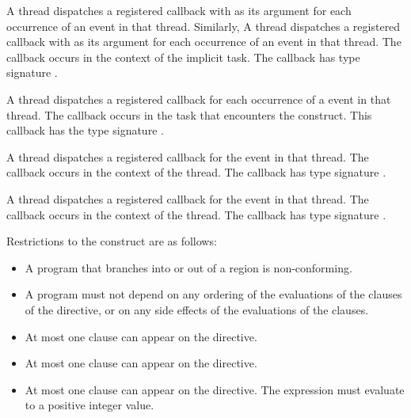 A thread dispatches a registered  callback 
with  as its  argument for each occurrence 
of an  event in that thread. Similarly, A thread 
dispatches a registered  callback with 
 as its  argument for each occurrence 
of an  event in that thread. The callback occurs in 
the context of the implicit task. The callback has type signature
.

A thread dispatches a registered 
callback for each occurrence of a  event in that
thread.  The callback occurs in the task that encounters the  
construct.  This callback has the type signature .

A thread dispatches a registered 
callback for the  event in that thread. The callback 
occurs in the context of the thread.  The callback has type signature
.

A thread dispatches a registered 
callback for the  event in that thread. The callback 
occurs in the context of the thread.  The callback has type signature
.

\restrictions
Restrictions to the  construct are as follows:

\begin{itemize}
\item A program that branches into or out of a  region is 
      non-conforming.
\item A program must not depend on any ordering of the evaluations of the clauses 
      of the  directive, or on any side effects of the evaluations 
      of the clauses.
\item At most one  clause can appear on the directive.
\item At most one  clause can appear on the directive.
\item At most one  clause can appear on the directive. 
      The  expression must evaluate to a positive integer value.

\end{itemize}

